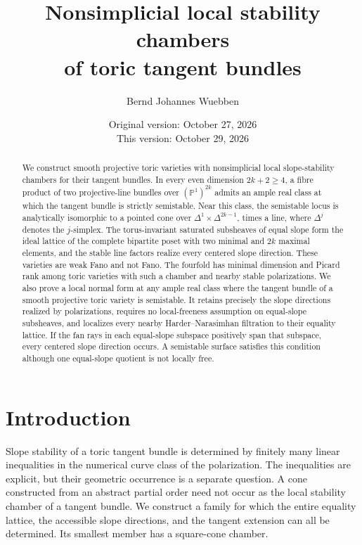 \documentclass[11pt]{amsart}
\title[Nonsimplicial tangent stability chambers]{Nonsimplicial local stability chambers\\of toric tangent bundles}
\author{Bernd Johannes Wuebben}
\date{Original version: October 27, 2026\\This version: October 29, 2026}
\theoremstyle{definition}
\theoremstyle{remark}
\newcommand{\PP}{\mathbb P}
\begin{document}
\begin{abstract}
We construct smooth projective toric varieties with nonsimplicial local
slope-stability chambers for their tangent bundles. In every even
dimension \(2k+2\ge4\), a fibre product of two projective-line bundles
over \((\PP^1)^{2k}\) admits an ample real class at which the tangent
bundle is strictly semistable. Near this class, the semistable locus
is analytically isomorphic to a pointed cone over
\(\Delta^1\times\Delta^{2k-1}\), times a line, where \(\Delta^j\)
denotes the \(j\)-simplex. The torus-invariant saturated subsheaves of
equal slope form the ideal lattice of the complete bipartite poset
with two minimal and \(2k\) maximal elements, and the stable line
factors realize every centered slope direction. These varieties are
weak Fano and not Fano. The fourfold has minimal dimension and Picard
rank among toric varieties with such a chamber and nearby stable
polarizations.
We also prove a local normal form at any ample real class where the
tangent bundle of a smooth projective toric variety is semistable.
It retains precisely the slope directions realized by polarizations,
requires no local-freeness assumption on equal-slope subsheaves, and
localizes every nearby Harder--Narasimhan filtration to their equality
lattice.
If the fan rays in each equal-slope subspace positively span that subspace,
every centered slope direction occurs. A semistable surface satisfies this condition although
one equal-slope quotient is not locally free.
\end{abstract}
\maketitle
\enlargethispage{5pt}


\section{Introduction}\label{sec01:intro}

Slope stability of a toric tangent bundle is determined by finitely many
linear inequalities in the numerical curve class of the polarization.
The inequalities are explicit, but their geometric occurrence is a
separate question. A cone constructed from an abstract partial order
need not occur as the local stability chamber of a tangent bundle.
We construct a family for which the entire equality lattice, the
accessible slope directions, and the tangent extension can all be
determined. Its smallest member has a square-cone chamber.
\end{document}
